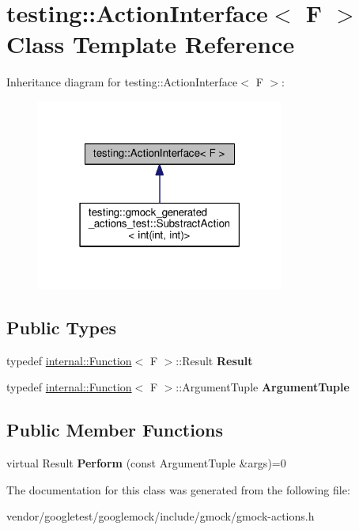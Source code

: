 \hypertarget{classtesting_1_1_action_interface}{}\section{testing\+:\+:Action\+Interface$<$ F $>$ Class Template Reference}
\label{classtesting_1_1_action_interface}


Inheritance diagram for testing\+:\+:Action\+Interface$<$ F $>$\+:
\nopagebreak
\begin{figure}[H]
\begin{center}
\leavevmode
\includegraphics[width=231pt]{classtesting_1_1_action_interface__inherit__graph}
\end{center}
\end{figure}
\subsection*{Public Types}
\begin{DoxyCompactItemize}
\item 
\mbox{\label{classtesting_1_1_action_interface_a7477de2fe3e4e01c59db698203acaee7}} 
typedef \mbox{\hyperlink{structtesting_1_1internal_1_1_function}{internal\+::\+Function}}$<$ F $>$\+::Result {\bfseries Result}
\item 
\mbox{\label{classtesting_1_1_action_interface_af72720d864da4d606629e83edc003511}} 
typedef \mbox{\hyperlink{structtesting_1_1internal_1_1_function}{internal\+::\+Function}}$<$ F $>$\+::Argument\+Tuple {\bfseries Argument\+Tuple}
\end{DoxyCompactItemize}
\subsection*{Public Member Functions}
\begin{DoxyCompactItemize}
\item 
\mbox{\label{classtesting_1_1_action_interface_a20f8624fcea1786f2992b358760422a0}} 
virtual Result {\bfseries Perform} (const Argument\+Tuple \&args)=0
\end{DoxyCompactItemize}


The documentation for this class was generated from the following file\+:\begin{DoxyCompactItemize}
\item 
vendor/googletest/googlemock/include/gmock/gmock-\/actions.\+h\end{DoxyCompactItemize}

